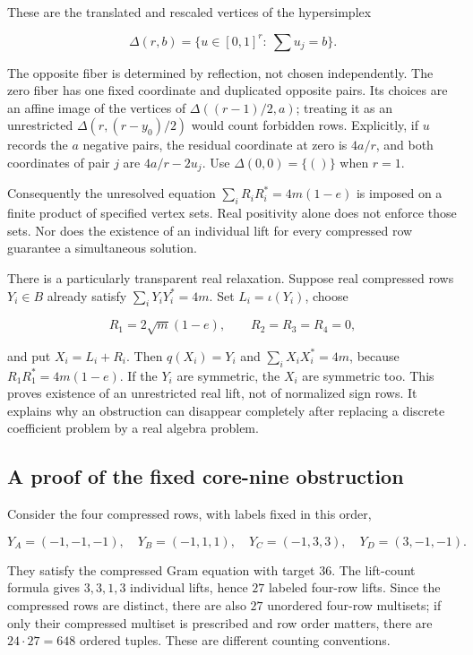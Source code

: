 \documentclass[
  11pt,
]{article}
\begin{document}
These are the translated and rescaled vertices of the hypersimplex

\[\Delta(r,b)=\{u\in[0,1]^r:\ \sum u_j=b\}.\]

The opposite fiber is determined by reflection, not chosen
independently. The zero fiber has one fixed coordinate and duplicated
opposite pairs. Its choices are an affine image of the vertices of
\(\Delta((r-1)/2,a)\); treating it as an unrestricted
\(\Delta(r,(r-y_0)/2)\) would count forbidden rows. Explicitly, if \(u\)
records the \(a\) negative pairs, the residual coordinate at zero is
\(4a/r\), and both coordinates of pair \(j\) are \(4a/r-2u_j\). Use
\(\Delta(0,0)=\{()\}\) when \(r=1\).

Consequently the unresolved equation \(\sum_iR_iR_i^*=4m(1-e)\) is
imposed on a finite product of specified vertex sets. Real positivity
alone does not enforce those sets. Nor does the existence of an
individual lift for every compressed row guarantee a simultaneous
solution.

There is a particularly transparent real relaxation. Suppose real
compressed rows \(Y_i\in B\) already satisfy \(\sum_iY_iY_i^*=4m\). Set
\(L_i=\iota(Y_i)\), choose

\[R_1=2\sqrt m(1-e),\qquad R_2=R_3=R_4=0,\]

and put \(X_i=L_i+R_i\). Then \(q(X_i)=Y_i\) and \(\sum_iX_iX_i^*=4m\),
because \(R_1R_1^*=4m(1-e)\). If the \(Y_i\) are symmetric, the \(X_i\)
are symmetric too. This proves existence of an unrestricted real lift,
not of normalized sign rows. It explains why an obstruction can
disappear completely after replacing a discrete coefficient problem by a
real algebra problem.

\subsection{A proof of the fixed core-nine
obstruction}\label{a-proof-of-the-fixed-core-nine-obstruction}

Consider the four compressed rows, with labels fixed in this order,

\[
Y_A=(-1,-1,-1),\quad Y_B=(-1,1,1),\quad
Y_C=(-1,3,3),\quad Y_D=(3,-1,-1).
\]

They satisfy the compressed Gram equation with target \(36\). The
lift-count formula gives \(3,3,1,3\) individual lifts, hence \(27\)
labeled four-row lifts. Since the compressed rows are distinct, there
are also \(27\) unordered four-row multisets; if only their compressed
multiset is prescribed and row order matters, there are
\(24\cdot27=648\) ordered tuples. These are different counting
conventions.
\end{document}
